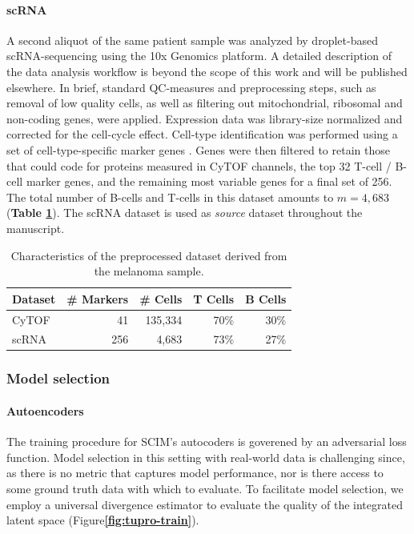 \paragraph{scRNA}
A second aliquot of the same patient sample was analyzed by droplet-based scRNA-sequencing using the 10x Genomics platform.
A detailed description of the data analysis workflow is beyond the scope of this work and will be published elsewhere.
In brief, standard QC-measures and preprocessing steps, such as removal of low quality cells, as well as filtering out mitochondrial, ribosomal and non-coding genes, were applied.
Expression data was library-size normalized and corrected for the cell-cycle effect.
Cell-type identification was performed using a set of cell-type-specific marker genes \cite{tirosh2016}.
Genes were then filtered to retain those that could code for proteins measured in CyTOF channels, the top 32 T-cell / B-cell marker genes, and the remaining most variable genes for a final set of 256.
The total number of B-cells and T-cells in this dataset amounts to $m{=}4,683$ (\textbf{Table \ref{tbl:tupro-dataset}}).
The scRNA dataset is used as \textit{source} dataset throughout the manuscript.

\begin{table}[ht]
    \centering
    \begin{tabular}{lrrrr}
    \toprule
    Dataset &  \# Markers &  \# Cells &  T Cells &  B Cells \\
    \midrule
    CyTOF &         41 &   135,334 &       70\% &       30\% \\
    scRNA &       256 &     4,683 &       73\% &       27\% \\
    \bottomrule
    \end{tabular}
    \caption{
        Characteristics of the preprocessed dataset derived from the melanoma sample.
    }
    \label{tbl:tupro-dataset}
\end{table}

\subsubsection{Model selection}
\paragraph{Autoencoders}
The training procedure for SCIM's autocoders is goverened by an adversarial loss function.
Model selection in this setting with real-world data is challenging since, as there is no metric that captures model performance, nor is there access to some ground truth data with which to evaluate.
To facilitate model selection, we employ a universal divergence estimator \cite{wang2009} to evaluate the quality of the integrated latent space (Figure\textbf{\ref{fig:tupro-train}}).

